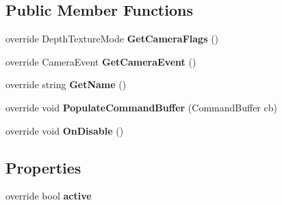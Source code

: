 \subsection*{Public Member Functions}
\begin{DoxyCompactItemize}
\item 
\mbox{\label{class_unity_engine_1_1_post_processing_1_1_builtin_debug_views_component_ab4292e4509256eb32cb378060fa3250f}} 
override Depth\+Texture\+Mode {\bfseries Get\+Camera\+Flags} ()
\item 
\mbox{\label{class_unity_engine_1_1_post_processing_1_1_builtin_debug_views_component_a6f11761eaeb91f54400f5b9a3f5864b2}} 
override Camera\+Event {\bfseries Get\+Camera\+Event} ()
\item 
\mbox{\label{class_unity_engine_1_1_post_processing_1_1_builtin_debug_views_component_a18f07a927f8d2aee8f5e7bf045b87714}} 
override string {\bfseries Get\+Name} ()
\item 
\mbox{\label{class_unity_engine_1_1_post_processing_1_1_builtin_debug_views_component_a5eb24d5ee1ad5360967bfd5bc2c8485b}} 
override void {\bfseries Populate\+Command\+Buffer} (Command\+Buffer cb)
\item 
\mbox{\label{class_unity_engine_1_1_post_processing_1_1_builtin_debug_views_component_a67be7492ee423602f45ad4ce2896fae1}} 
override void {\bfseries On\+Disable} ()
\end{DoxyCompactItemize}
\subsection*{Properties}
\begin{DoxyCompactItemize}
\item 
\mbox{\label{class_unity_engine_1_1_post_processing_1_1_builtin_debug_views_component_a278b64dc1a7dc3dfae9f829accb1592c}} 
override bool {\bfseries active}
\end{DoxyCompactItemize}
